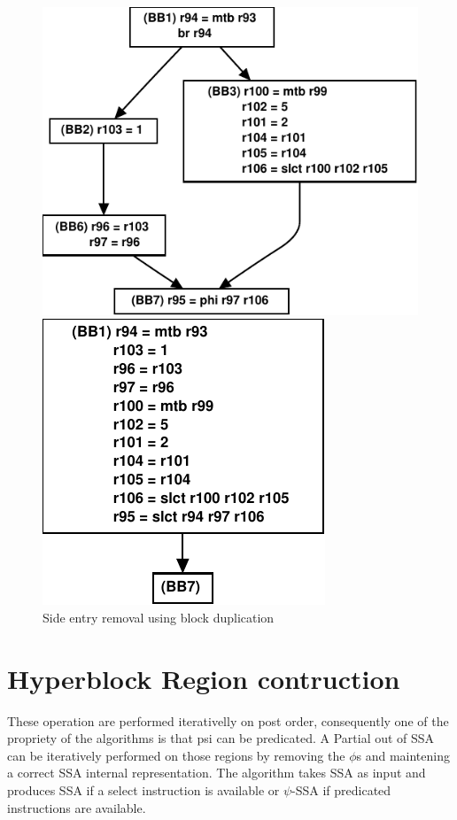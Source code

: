 \begin{figure}[th]
\begin{minipage}[b]{3cm}
\includegraphics[scale=0.3]{g3.pdf}
\end{minipage}
\begin{minipage}[b]{3cm}
\includegraphics[scale=0.3]{g4.pdf}
\end{minipage}
\caption{Side entry removal using block duplication}
\label{fig:bbdup}
\end{figure}

\section{Hyperblock Region contruction}

These operation are performed iterativelly on post order, consequently one of the propriety of the algorithms is that psi can be predicated. A Partial out of SSA can be iteratively performed on those regions by removing the $\phi$s and maintening a correct SSA internal representation. The algorithm takes SSA as input and produces SSA if a select instruction is available or $\psi$-SSA if predicated instructions are available. 

